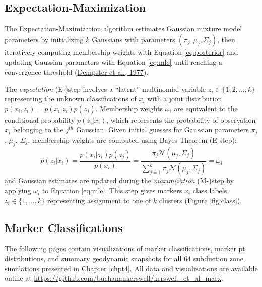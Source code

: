 \hypertarget{expectation-maximization}{%
\subsection{Expectation-Maximization}\label{expectation-maximization}}

The Expectation-Maximization algorithm estimates Gaussian mixture model parameters by initializing \(k\) Gaussians with parameters \((\pi_j, \mu_j, \Sigma_j)\), then iteratively computing membership weights with Equation \eqref{eq:posterior} and updating Gaussian parameters with Equation \eqref{eq:mle} until reaching a convergence threshold (\protect\hyperlink{ref-dempster1977}{Dempster et al., 1977}).

The \emph{expectation} (E-)step involves a ``latent'' multinomial variable \(z_{i} \in \{1, 2, \dots, k\}\) representing the unknown classifications of \(x_i\) with a joint distribution \(p(x_i,z_{i}) = p(x_i | z_{i})p(z_{j})\). Membership weights \(\omega_{i}\) are equivalent to the conditional probability \(p(z_{i} | x_i)\), which represents the probability of observation \(x_i\) belonging to the \(j^{th}\) Gaussian. Given initial guesses for Gaussian parameters \(\pi_j\), \(\mu_j\), \(\Sigma_j\), membership weights are computed using Bayes Theorem (E-step):
\begin{equation}
  p(z_{i} | x_i) = \frac{p(x_i | z_{i})p(z_{j})}{p(x_i)} = \frac{\pi_j \mathcal{N}(\mu_j, \Sigma_j)}{\sum_{j=1}^k \pi_j \mathcal{N}(\mu_j, \Sigma_j)} = \omega_{i}
  \label{eq:posterior}
\end{equation}
and Gaussian estimates are updated during the \emph{maximization} (M-)step by applying \(\omega_{i}\) to Equation \eqref{eq:mle}. This step gives markers \(x_i\) class labels \(z_i \in \{1, \dots, k\}\) representing assignment to one of \(k\) clusters (Figure \ref{fig:class}).

\cleardoublepage

\hypertarget{vis}{%
\subsection{Marker Classifications}\label{vis}}

The following pages contain visualizations of marker classifications, marker \gls{pt} distributions, and summary geodynamic snapshots for all 64 subduction zone simulations presented in Chapter \ref{chpt4}. All data and visualizations are available online at \url{https://github.com/buchanankerswell/kerswell_et_al_marx}.


